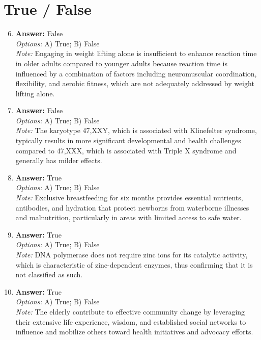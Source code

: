 \documentclass[12pt]{article}
\begin{document}
\section*{True / False}
\begin{enumerate}[label=\arabic*.]
\setcounter{enumi}{5}
\item \textbf{Answer:} False
\\ \textit{Options:} A) True; B) False
\\ \textit{Note:} Engaging in weight lifting alone is insufficient to enhance reaction time in older adults compared to younger adults because reaction time is influenced by a combination of factors including neuromuscular coordination, flexibility, and aerobic fitness, which are not adequately addressed by weight lifting alone.
\item \textbf{Answer:} False
\\ \textit{Options:} A) True; B) False
\\ \textit{Note:} The karyotype 47,XXY, which is associated with Klinefelter syndrome, typically results in more significant developmental and health challenges compared to 47,XXX, which is associated with Triple X syndrome and generally has milder effects.
\item \textbf{Answer:} True
\\ \textit{Options:} A) True; B) False
\\ \textit{Note:} Exclusive breastfeeding for six months provides essential nutrients, antibodies, and hydration that protect newborns from waterborne illnesses and malnutrition, particularly in areas with limited access to safe water.
\item \textbf{Answer:} True
\\ \textit{Options:} A) True; B) False
\\ \textit{Note:} DNA polymerase does not require zinc ions for its catalytic activity, which is characteristic of zinc-dependent enzymes, thus confirming that it is not classified as such.
\item \textbf{Answer:} True
\\ \textit{Options:} A) True; B) False
\\ \textit{Note:} The elderly contribute to effective community change by leveraging their extensive life experience, wisdom, and established social networks to influence and mobilize others toward health initiatives and advocacy efforts.
\end{enumerate}
\end{document}
